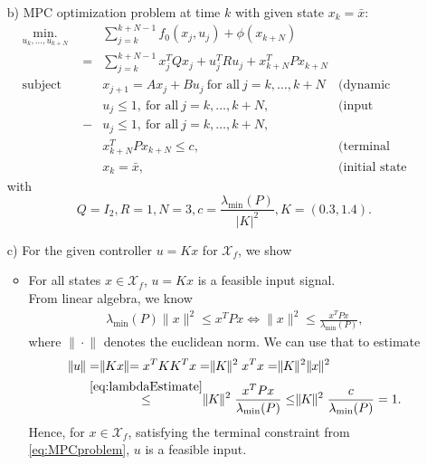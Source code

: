 \documentclass[]{article}
\newcommand{\trp}{^T}
\newcommand{\xj}{x_j}
\newcommand{\xk}{x_k}
\newcommand{\uj}{u_j}
\newcommand{\norm}[1]{\parallel \! \! #1 \! \! \parallel}
\newcommand{\xbar}{\bar{x}}
\newcommand{\X}{\mathcal{X}}
\newcommand{\lambdamin}{\lambda_{\mathrm{min}}}
\newcommand{\Xf}{\X_f}
\begin{document}
\begin{enumerate}
			\item[b)] MPC optimization problem at time $ k $ with given state $ x_k = \xbar $:
				\begin{equation}
				\begin{aligned} \label{eq:MPCproblem}
				& \underset{u_k,\dots, u_{k+N}}{\text{min.}}
				& & \sum_{j = k}^{k + N -1} f_0(\xj,\uj) + \phi(x_{k+N})\\  & & = &\sum_{j = k}^{k + N -1}   \xj \trp Q \xj + \uj \trp R \uj + x_{k + N} \trp P x_{k + N}\\
				& \text{subject to}
				& & x_{j+1} =A \xj + B \uj \ \text{for all} \ j = k,\dots,k+N &\text{(dynamic constraints)}\\
				& & & \uj \leq 1, \ \text{for all} \ j = k,\dots,k+N, &\text{(input constraints)}\\ 
				& & -&\uj \leq 1, \ \text{for all} \ j = k,\dots,k+N,\\
				& & & x_{k+N}\trp P x_{k+N} \leq c, &\text{(terminal constraint)}\\
				& & & \xk = \xbar, &\text{(initial state constraint)}
				\end{aligned}
				\end{equation}
				with \[ Q = I_2, R = 1, N = 3, c = \frac{\lambdamin (P)}{|K|^2}, K = (0.3 , 1.4). \]
			\item[c)]
			For the given controller $ u = Kx $ for $ \Xf $, we show
				\begin{itemize}
					\item For all states $ x \in \Xf $, $ u = Kx $ is a feasible input signal.\\
						From linear algebra, we know
						\begin{align}
							\lambdamin(P) \norm{x}^2 \leq x\trp Px \Longleftrightarrow \norm{x}^2\leq  \frac{x\trp Px}{\lambdamin(P)}, \label{eq:lambdaEstimate}
						\end{align}
						where $ \norm{\cdot} $ denotes the euclidean norm.
						We can use that to estimate
						\begin{align}
							\norm{u} &= \norm{Kx} = x\trp KK \trp x = \norm{K}^2 x\trp x = \norm{K}^2 \norm{x}^2 \\
							&\overset{\eqref{eq:lambdaEstimate}}{\leq} \norm{K}^2 \frac{x\trp Px}{\lambdamin(P)} \leq \norm{K}^2 \frac{c}{\lambdamin(P)} = 1.
						\end{align}
						Hence, for $ x\in\Xf $, satisfying the terminal constraint from \eqref{eq:MPCproblem}, $ u $ is a feasible input.
						

\end{itemize}
\end{enumerate}
\end{document}

